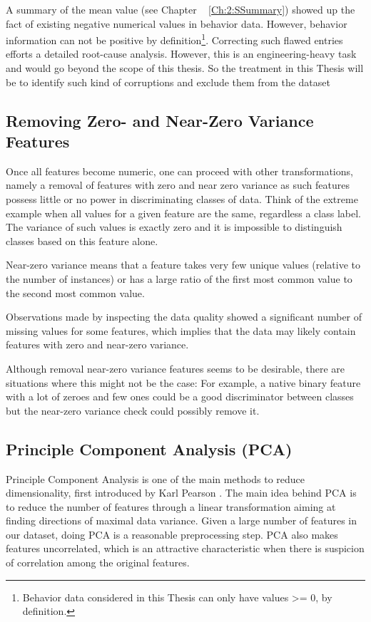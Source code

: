 A summary of the mean value (see Chapter ~ \ref{Ch:2:SSummary}) showed up the fact of existing negative numerical values in behavior data. However, behavior information can not be positive by definition\footnote{Behavior data considered in this Thesis can only have values >= 0, by definition.}.
Correcting such flawed entries efforts a detailed root-cause analysis. However, this is an engineering-heavy task and would go beyond the scope of this thesis. So the treatment in this Thesis will be to identify such kind of corruptions and exclude them from the dataset 


\subsection{Removing Zero- and Near-Zero Variance Features}\label{Ch:2:RNZVF}
Once all features become numeric, one can proceed with other transformations, namely a removal of features with zero and near zero variance as such features possess little or no power in discriminating classes of data. Think of the extreme example when all values for a given feature are the same, regardless a class label. The variance of such values is exactly zero and it is impossible to distinguish classes based on this feature alone.

Near-zero variance means that a feature takes very few unique values (relative to the number of instances) or has a large ratio of the first most common value to the second most common value.

Observations made by inspecting the data quality showed a significant number of missing values for some features, which implies that the data may likely contain features with zero and near-zero variance.

Although removal near-zero variance features seems to be desirable, there are situations where this might not be the case: For example, a native binary feature with a lot of zeroes and few ones could be a good discriminator between classes but the near-zero variance check could possibly remove it.

\subsection{Principle Component Analysis (PCA)}\label{Ch:2:PCA} 
Principle Component Analysis is one of the main methods to reduce dimensionality, first introduced by Karl Pearson \cite{Pearson:1901}. The main idea behind PCA is to reduce the number of features through a linear transformation aiming at finding directions of maximal data variance. Given a large number of features in our dataset, doing PCA is a reasonable preprocessing step. PCA also makes features uncorrelated, which is an attractive characteristic when there is suspicion of correlation among the original features.

